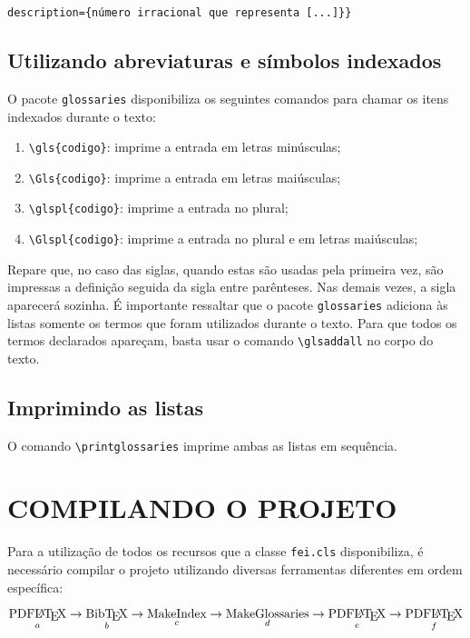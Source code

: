 \documentclass{fei}
\begin{document}
			 \verb+description={número irracional que representa [...]}}+

	\section{Utilizando abreviaturas e símbolos indexados}
	
	O pacote \verb+glossaries+ disponibiliza os seguintes comandos para chamar os itens indexados durante o texto:
	
	\begin{enumerate}
	\item \verb+\gls{codigo}+: imprime a entrada em letras minúsculas;
	\item \verb+\Gls{codigo}+: imprime a entrada em letras maiúsculas;
	\item \verb+\glspl{codigo}+: imprime a entrada no plural;
	\item \verb+\Glspl{codigo}+: imprime a entrada no plural e em letras maiúsculas;
	\end{enumerate}
	
	Repare que, no caso das siglas, quando estas são usadas pela primeira vez, são impressas a definição seguida da sigla entre parênteses. Nas demais vezes, a sigla aparecerá sozinha. É importante ressaltar que o pacote \texttt{glossaries} adiciona às listas somente os termos que foram utilizados durante o texto. Para que todos os termos declarados apareçam, basta usar o comando \verb+\glsaddall+ no corpo do texto.
	
	\section{Imprimindo as listas}
	
	O comando \verb+\printglossaries+ imprime ambas as listas em sequência.

	\chapter{COMPILANDO O PROJETO} \label{chap:compilando}
	
	Para a utilização de todos os recursos que a classe \verb+fei.cls+ disponibiliza, é necessário compilar o projeto utilizando diversas ferramentas diferentes em ordem específica:
	
	\[\operatorname*{\text{PDF\LaTeX}}_a \to \operatorname*{\text{Bib\TeX}}_b \to \operatorname*{\text{MakeIndex}}_c \to \operatorname*{\text{MakeGlossaries}}_d \to \operatorname*{\text{PDF\LaTeX}}_e \to \operatorname*{\text{PDF\LaTeX}}_f\]
	
\end{document}
